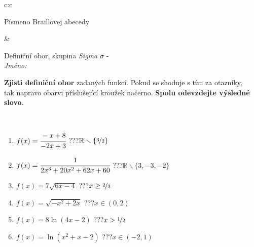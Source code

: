 \documentclass[10pt]{report}
\begin{document}
\begin{tabular}{c:c}
\begin{minipage}[c][104.5mm][t]{0.5\linewidth}
\begin{center}
\begin{minipage}{0.20\linewidth}
\begin{center}
{\small Písmeno Braillovej abecedy}
\end{center}
\end{minipage}
\end{center}
\end{minipage}
&
\begin{minipage}[c][104.5mm][t]{0.5\linewidth}
\begin{center}
\vspace{7mm}
{\huge Definiční obor, skupina \textit{Sigma $\sigma$} -}\\[5mm]
\textit{Jméno:}\phantom{xxxxxxxxxxxxxxxxxxxxxxxxxxxxxxxxxxxxxxxxxxxxxxxxxxxxxxxxxxxxxxxxx}\\[5mm]
\begin{minipage}{0.95\linewidth}
\begin{center}
\textbf{Zjisti definiční obor} zadaných funkcí. Pokud se shoduje s tím za otazníky,\\tak napravo obarvi příslušející kroužek načerno. \textbf{Spolu odevzdejte výsledné slovo}.
\end{center}
\end{minipage}
\\[1mm]
\begin{minipage}{0.79\linewidth}
\begin{center}
\begin{varwidth}{\linewidth}
\begin{enumerate}
\normalsizerrr
\item $f(x)=\cfrac{-x+8}{-2x+3}$\quad \dotfill\; ???\;\dotfill \quad $\mathbb{R}\smallsetminus\{\nicefrac{3}{2}\}$
\item $f(x)=\cfrac{1}{2x^3+20x^2+62x+60}$\quad \dotfill\; ???\;\dotfill \quad $\mathbb{R}\smallsetminus\{3,-3,-2\}$
\item $f(x)=7\sqrt{6x-4}$\quad \dotfill\; ???\;\dotfill \quad $x\geq\nicefrac{2}{3}$
\item $f(x)=\sqrt{-x^2+2x}$\quad \dotfill\; ???\;\dotfill \quad $x\in(0 , 2)$
\item $f(x)=8\ln{(4x-2)}$\quad \dotfill\; ???\;\dotfill \quad $x>\nicefrac{1}{2}$
\item $f(x)=\ln{(x^2+x-2)}$\quad \dotfill\; ???\;\dotfill \quad $x\in(-2 , 1)$
\end{enumerate}
\end{varwidth}
\end{center}
\end{minipage}
\begin{minipage}{0.20\linewidth}
\begin{center}

\end{center}
\end{minipage}
\end{center}
\end{minipage}
\end{tabular}
\end{document}

